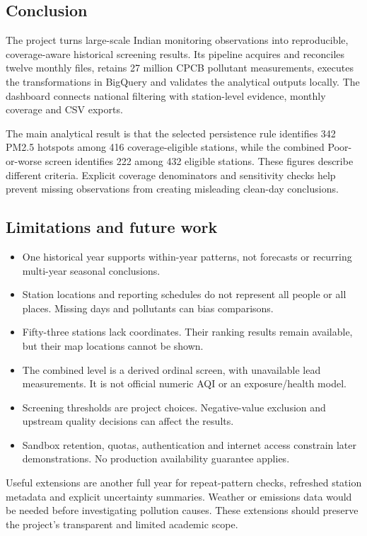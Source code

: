 \documentclass[11pt,a4paper]{article}
\begin{document}
\subsection{Conclusion}
The project turns large-scale Indian monitoring observations into reproducible, coverage-aware historical screening results. Its pipeline acquires and reconciles twelve monthly files, retains 27 million CPCB pollutant measurements, executes the transformations in BigQuery and validates the analytical outputs locally. The dashboard connects national filtering with station-level evidence, monthly coverage and CSV exports.

The main analytical result is that the selected persistence rule identifies 342 PM2.5 hotspots among 416 coverage-eligible stations, while the combined Poor-or-worse screen identifies 222 among 432 eligible stations. These figures describe different criteria. Explicit coverage denominators and sensitivity checks help prevent missing observations from creating misleading clean-day conclusions.

\subsection{Limitations and future work}
\begin{itemize}
\item One historical year supports within-year patterns, not forecasts or recurring multi-year seasonal conclusions.
\item Station locations and reporting schedules do not represent all people or all places. Missing days and pollutants can bias comparisons.
\item Fifty-three stations lack coordinates. Their ranking results remain available, but their map locations cannot be shown.
\item The combined level is a derived ordinal screen, with unavailable lead measurements. It is not official numeric AQI or an exposure/health model.
\item Screening thresholds are project choices. Negative-value exclusion and upstream quality decisions can affect the results.
\item Sandbox retention, quotas, authentication and internet access constrain later demonstrations. No production availability guarantee applies.
\end{itemize}

Useful extensions are another full year for repeat-pattern checks, refreshed station metadata and explicit uncertainty summaries. Weather or emissions data would be needed before investigating pollution causes. These extensions should preserve the project's transparent and limited academic scope.
\end{document}
